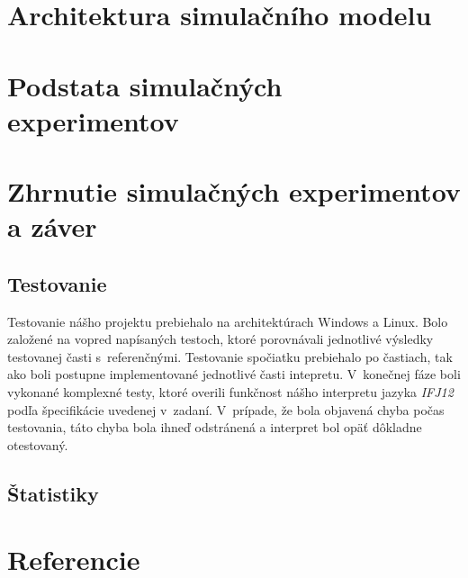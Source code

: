 \documentclass[12pt,a4paper,titlepage,final]{article}
\begin{document}
\section{Architektura simulačního modelu}
\newpage


\section{Podstata simulačných experimentov}

\section{Zhrnutie simulačných experimentov a záver}

\subsection{Testovanie}
Testovanie nášho projektu prebiehalo na architektúrach Windows a Linux. Bolo založené na vopred napísaných testoch, ktoré porovnávali jednotlivé výsledky testovanej časti s~referenčnými. Testovanie spočiatku prebiehalo po častiach, tak ako boli postupne implementované jednotlivé časti intepretu.
V~konečnej fáze boli vykonané komplexné testy, ktoré overili funkčnost nášho interpretu jazyka \emph{IFJ12} podľa špecifikácie uvedenej v~zadaní. V~prípade, že bola objavená chyba počas testovania, táto chyba bola ihneď odstránená a interpret bol opäť dôkladne otestovaný.


\subsection{Štatistiky}
\newpage


 
\newpage




\newpage

\section{Referencie}





\newpage
\end{document}
